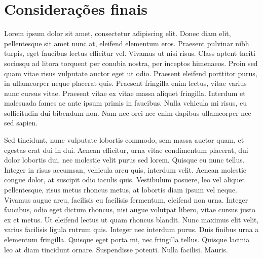 \documentclass[
	article,			%
	11pt,				%
	oneside,			%
	a4paper,			%
	english,			%
	brazil,				%
	sumario=tradicional
	]{abntex2}
\begin{document}

\textual










% 

\section*{Considerações finais}


Lorem ipsum dolor sit amet, consectetur adipiscing elit. Donec diam elit, pellentesque sit amet nunc at, eleifend elementum eros. Praesent pulvinar nibh turpis, eget faucibus lectus efficitur vel. Vivamus ut nisi risus. Class aptent taciti sociosqu ad litora torquent per conubia nostra, per inceptos himenaeos. Proin sed quam vitae risus vulputate auctor eget ut odio. Praesent eleifend porttitor purus, in ullamcorper neque placerat quis. Praesent fringilla enim lectus, vitae varius nunc cursus vitae. Praesent vitae ex vitae massa aliquet fringilla. Interdum et malesuada fames ac ante ipsum primis in faucibus. Nulla vehicula mi risus, eu sollicitudin dui bibendum non. Nam nec orci nec enim dapibus ullamcorper nec sed sapien.

Sed tincidunt, nunc vulputate lobortis commodo, sem massa auctor quam, et egestas erat dui in dui. Aenean efficitur, urna vitae condimentum placerat, dui dolor lobortis dui, nec molestie velit purus sed lorem. Quisque eu nunc tellus. Integer in risus accumsan, vehicula arcu quis, interdum velit. Aenean molestie congue dolor, at suscipit odio iaculis quis. Vestibulum posuere, leo vel aliquet pellentesque, risus metus rhoncus metus, at lobortis diam ipsum vel neque. Vivamus augue arcu, facilisis eu facilisis fermentum, eleifend non urna. Integer faucibus, odio eget dictum rhoncus, nisi augue volutpat libero, vitae cursus justo ex et metus. Ut eleifend lectus ut quam rhoncus blandit. Nunc maximus elit velit, varius facilisis ligula rutrum quis. Integer nec interdum purus. Duis finibus urna a elementum fringilla. Quisque eget porta mi, nec fringilla tellus. Quisque lacinia leo at diam tincidunt ornare. Suspendisse potenti. Nulla facilisi. Mauris. 
\end{document}
